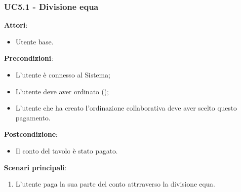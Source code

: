 \subsubsection{UC5.1 - Divisione equa}\label{usecase:5.1}
\textbf{Attori}:
\begin{itemize}
    \item Utente base.
\end{itemize}
\textbf{Precondizioni}:
\begin{itemize}
    \item L'utente è connesso al Sistema;
    \item L'utente deve aver ordinato ();
    \item L'utente che ha creato l'ordinazione collaborativa deve aver scelto questo pagamento.
\end{itemize}
\textbf{Postcondizione}:
\begin{itemize}
    \item Il conto del tavolo è stato pagato.
\end{itemize}
\textbf{Scenari principali}:
\begin{enumerate}
    \item L'utente paga la sua parte del conto attrraverso la divisione equa.
\end{enumerate}